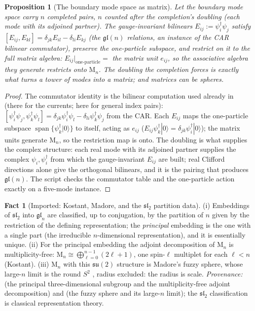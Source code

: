 \documentclass[11pt]{article}
\newtheorem{proposition}[theorem]{Proposition}
\theoremstyle{definition}
\newtheorem{fact}[theorem]{Fact}
\newcommand{\Mat}{\mathrm{M}}
\begin{document}
\begin{proposition}[The boundary mode space as matrix]\label{prop:matrix}
Let the boundary mode space carry $n$ completed pairs, $n$ counted after the completion's doubling (each mode with its adjoined partner). The gauge-invariant bilinears $E_{ij} := \psi_i^\dagger \psi_j$ satisfy $[E_{ij}, E_{kl}] = \delta_{jk}E_{il} - \delta_{li}E_{kj}$ (the $\mathfrak{gl}(n)$ relations, an instance of the CAR bilinear commutator), preserve the one-particle subspace, and restrict on it to the full matrix algebra: $E_{ij}|_{\text{one-particle}} = $ the matrix unit $e_{ij}$, so the associative algebra they generate restricts onto $\Mat_n$. The doubling the completion forces is exactly what turns a tower of modes into a matrix; and matrices can be spheres.
\end{proposition}

\begin{proof}
The commutator identity is the bilinear computation used already in \cite[Prop.~6.1]{ButlerT7} (there for the currents; here for general index pairs): $[\psi_i^\dagger\psi_j, \psi_k^\dagger\psi_l] = \delta_{jk}\psi_i^\dagger\psi_l - \delta_{li}\psi_k^\dagger\psi_j$ from the CAR. Each $E_{ij}$ maps the one-particle subspace $\operatorname{span}\{\psi_k^\dagger|0\rangle\}$ to itself, acting as $e_{ij}$ ($E_{ij}\psi_k^\dagger|0\rangle = \delta_{jk}\psi_i^\dagger|0\rangle$); the matrix units generate $\Mat_n$, so the restriction map is onto. The doubling is what supplies the complex structure: each real mode with its adjoined partner supplies the complex $\psi_i, \psi_i^\dagger$ from which the gauge-invariant $E_{ij}$ are built; real Clifford directions alone give the orthogonal bilinears, and it is the pairing that produces $\mathfrak{gl}(n)$. The script checks the commutator table and the one-particle action exactly on a five-mode instance.
\end{proof}

\begin{fact}[Imported: Kostant, Madore, and the $\mathfrak{sl}_2$ partition data]\label{fact:kostant}
(i) Embeddings of $\mathfrak{sl}_2$ into $\mathfrak{gl}_n$ are classified, up to conjugation, by the partition of $n$ given by the restriction of the defining representation; the \emph{principal} embedding is the one with a single part (the irreducible $n$-dimensional representation), and it is essentially unique. (ii) For the principal embedding the adjoint decomposition of $\Mat_n$ is multiplicity-free: $\Mat_n \cong \bigoplus_{\ell=0}^{n-1}(2\ell + 1)$, one spin-$\ell$ multiplet for each $\ell < n$ (Kostant). (iii) $\Mat_n$ with this $\mathfrak{su}(2)$ structure is Madore's fuzzy sphere, whose large-$n$ limit is the round $S^2$ \cite{Madore1992}, radius excluded: the radius is scale. \emph{Provenance:} \cite{Kostant1959} (the principal three-dimensional subgroup and the multiplicity-free adjoint decomposition) and \cite{Madore1992} (the fuzzy sphere and its large-$n$ limit); the $\mathfrak{sl}_2$ classification is classical representation theory.
\end{fact}
\end{document}
